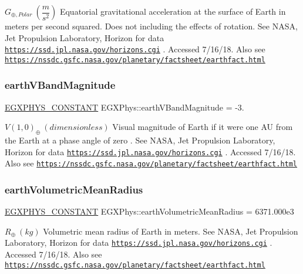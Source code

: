 $ G_{\oplus,Polar} \ (\dfrac{m}{s^2})$ Equatorial gravitational acceleration at the surface of Earth in meters per second squared. Does not including the effects of rotation. See N\+A\+SA, Jet Propulsion Laboratory, Horizon for data \href{https://ssd.jpl.nasa.gov/horizons.cgi}{\tt https\+://ssd.\+jpl.\+nasa.\+gov/horizons.\+cgi} . Accessed 7/16/18. Also see \href{https://nssdc.gsfc.nasa.gov/planetary/factsheet/earthfact.html}{\tt https\+://nssdc.\+gsfc.\+nasa.\+gov/planetary/factsheet/earthfact.\+html} \mbox{\label{group___e_g_x_phys-_constants-_astrophysics-_solar_system-_earth-_bulk_ga184e55af75c87cafba30c63d054cb189}} 
\subsubsection{\texorpdfstring{earth\+V\+Band\+Magnitude}{earthVBandMagnitude}}
{\footnotesize\ttfamily \mbox{\hyperlink{group___e_g_x_phys-_constants-_macros_ga76980d288494ce1714c9ac68a95ba702}{E\+G\+X\+P\+H\+Y\+S\+\_\+\+C\+O\+N\+S\+T\+A\+NT}} E\+G\+X\+Phys\+::earth\+V\+Band\+Magnitude = -\/3.}

$ V(1,0)_{\oplus} \ (dimensionless)$ Visual magnitude of Earth if it were one AU from the Earth at a phase angle of zero . See N\+A\+SA, Jet Propulsion Laboratory, Horizon for data \href{https://ssd.jpl.nasa.gov/horizons.cgi}{\tt https\+://ssd.\+jpl.\+nasa.\+gov/horizons.\+cgi} . Accessed 7/16/18. Also see \href{https://nssdc.gsfc.nasa.gov/planetary/factsheet/earthfact.html}{\tt https\+://nssdc.\+gsfc.\+nasa.\+gov/planetary/factsheet/earthfact.\+html} \mbox{\label{group___e_g_x_phys-_constants-_astrophysics-_solar_system-_earth-_bulk_ga403e9a295cb108232c7a041dde01d02b}} 
\subsubsection{\texorpdfstring{earth\+Volumetric\+Mean\+Radius}{earthVolumetricMeanRadius}}
{\footnotesize\ttfamily \mbox{\hyperlink{group___e_g_x_phys-_constants-_macros_ga76980d288494ce1714c9ac68a95ba702}{E\+G\+X\+P\+H\+Y\+S\+\_\+\+C\+O\+N\+S\+T\+A\+NT}} E\+G\+X\+Phys\+::earth\+Volumetric\+Mean\+Radius = 6371.\+000e3}

$R_{\oplus} \ (kg)$ Volumetric mean radius of Earth in meters. See N\+A\+SA, Jet Propulsion Laboratory, Horizon for data \href{https://ssd.jpl.nasa.gov/horizons.cgi}{\tt https\+://ssd.\+jpl.\+nasa.\+gov/horizons.\+cgi} . Accessed 7/16/18. Also see \href{https://nssdc.gsfc.nasa.gov/planetary/factsheet/earthfact.html}{\tt https\+://nssdc.\+gsfc.\+nasa.\+gov/planetary/factsheet/earthfact.\+html} 